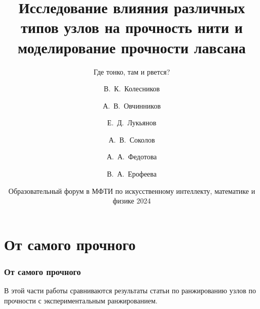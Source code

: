 \documentclass{beamer}
\title[] %
{Исследование влияния различных типов узлов на прочность нити и моделирование прочности лавсана}
\subtitle{Где тонко, там и рвется?}
\author[] %
{В.~К.~Колесников\inst{1} \and А.~В.~Овчинников\inst{2} \and Е.~Д.~Лукьянов \inst{3} \and А.~В.~Соколов \inst{4} \and А.~А.~Федотова \inst{5} \and В.~А.~Ерофеева \inst{6}}
\institute[Образовательный форум в МФТИ] %
{
  \inst{1}%
  МАИ
  \and
  \inst{2}%
  МФТИ
  \and
  \inst{3}%
  МГТУ им Г. И. Носова
  \and
  \inst{4}%
  ЮФУ
  \and
  \inst{5}%
  МГТУ им н.э. Баумана
  \and
  \inst{6}%
  ИГУ
}
\date[] %
{Образовательный форум в МФТИ по искусственному интеллекту, математике и физике 2024}
\begin{document}
\begin{frame}
\maketitle
\end{frame}



\section{От самого прочного}

\begin{frame}
\frametitle{От самого прочного}
    В этой части работы сравниваются результаты статьи по ранжированию узлов по прочности с экспериментальным ранжированием.
\end{frame}
\end{document}

